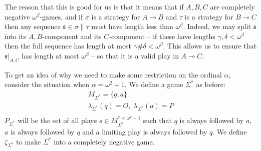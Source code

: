 \documentclass[11pt]{article} %
\theoremstyle{plain} %
\theoremstyle{definition} %
\theoremstyle{note}
\theoremstyle{exercisestyle}
\renewcommand{\implies}{\multimap}
\newcommand{\s}{\mathfrak s}
\newcommand{\st}{{\Sigma^*}}
\begin{document}
The reason that this is good for us is that it means that if $A,B,C$ are completely negative $\omega^\beta$-games, and if $\sigma$ is a strategy for $A\implies B$ and $\tau$ is a strategy for $B\implies C$ then any sequence $\s\in\sigma\|\tau$ must have length less than $\omega^\beta$.  Indeed, we may split $\s$ into its $A,B$-component and its $C$-component -- if these have lengths $\gamma,\delta<\omega^\beta$ then the full sequence has length at most $\gamma\#\delta<\omega^\beta$.  This allows us to ensure that $\s\vert_{A,C}$ has length at most $\omega^\beta$ -- so that it is a valid play in $A\implies C$.

To get an idea of why we need to make some restriction on the ordinal $\alpha$, consider the situation when $\alpha=\omega^2+1$.  We define a game $\st$ as before:
\begin{gather*}
  M_{\st} = \{q,a\} \\
  \lambda_{\st}(q) = O,\;\lambda_{\st}(a)=P \\
\end{gather*}
$P_\st$ will be the set of all plays $s\in M_\st^{*<\omega^2+1}$ such that $q$ is always followed by $a$, $a$ is always followed by $q$ and a limiting play is always followed by $q$.  We define $\zeta_\st$ to make $\st$ into a completely negative game.  
\end{document}
